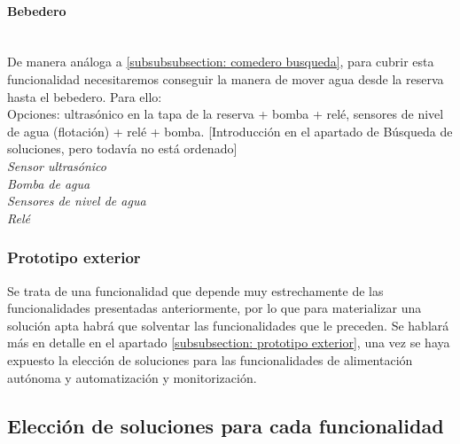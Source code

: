 \documentclass[12pt]{article}
\newcommand{\subsubsubsection}[1]{\paragraph{#1}\mbox{}\\}
\begin{document}
	\pagebreak
	
	\subsubsubsection{Bebedero}
	
	\noindent De manera análoga a \ref{subsubsubsection: comedero busqueda}, para cubrir esta funcionalidad necesitaremos conseguir la manera de mover agua desde la reserva hasta el bebedero. Para ello: \\
	
	\noindent Opciones: ultrasónico en la tapa de la reserva + bomba + relé, sensores de nivel de agua (flotación) + relé + bomba. [Introducción en el apartado de Búsqueda de soluciones, pero todavía no está ordenado]\\
	
	\noindent \textit{Sensor ultrasónico}\\
	
	\noindent \textit{Bomba de agua} \\
	
	\noindent \textit{Sensores de nivel de agua} \\
	
	\noindent \textit{Relé} \\
	
	\pagebreak
	
	\subsubsection{Prototipo exterior}
	
	\noindent Se trata de una funcionalidad que depende muy estrechamente de las funcionalidades presentadas anteriormente, por lo que para materializar una solución apta habrá que solventar las funcionalidades que le preceden. Se hablará más en detalle en el apartado \ref{subsubsection: prototipo exterior}, una vez se haya expuesto la elección de soluciones para las funcionalidades de alimentación autónoma y automatización y monitorización.
	\pagebreak
	
	\subsection[Elección soluciones]{Elección de soluciones para cada funcionalidad}
	\label{Subsección 3.3: elección de soluciones para cada funcionalidad}
	
\end{document}
